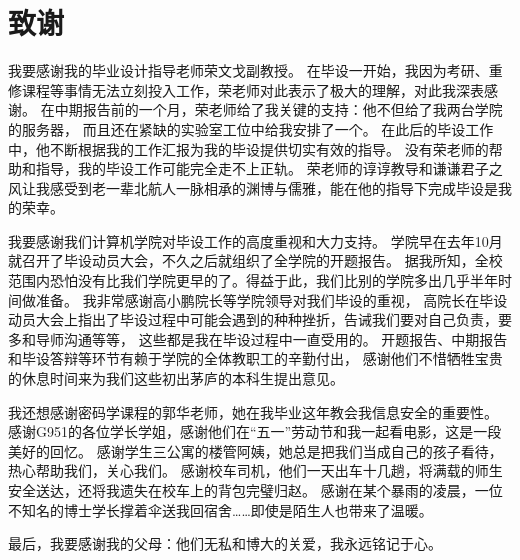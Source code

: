% 
% 
% 
% 

\chapter*{致谢}
我要感谢我的毕业设计指导老师荣文戈副教授。
在毕设一开始，我因为考研、重修课程等事情无法立刻投入工作，荣老师对此表示了极大的理解，对此我深表感谢。
在中期报告前的一个月，荣老师给了我关键的支持：他不但给了我两台学院的服务器，
而且还在紧缺的实验室工位中给我安排了一个。
在此后的毕设工作中，他不断根据我的工作汇报为我的毕设提供切实有效的指导。
没有荣老师的帮助和指导，我的毕设工作可能完全走不上正轨。
荣老师的谆谆教导和谦谦君子之风让我感受到老一辈北航人一脉相承的渊博与儒雅，能在他的指导下完成毕设是我的荣幸。

我要感谢我们计算机学院对毕设工作的高度重视和大力支持。
学院早在去年10月就召开了毕设动员大会，不久之后就组织了全学院的开题报告。
据我所知，全校范围内恐怕没有比我们学院更早的了。得益于此，我们比别的学院多出几乎半年时间做准备。
我非常感谢高小鹏院长等学院领导对我们毕设的重视，
高院长在毕设动员大会上指出了毕设过程中可能会遇到的种种挫折，告诫我们要对自己负责，要多和导师沟通等等，
这些都是我在毕设过程中一直受用的。
开题报告、中期报告和毕设答辩等环节有赖于学院的全体教职工的辛勤付出，
感谢他们不惜牺牲宝贵的休息时间来为我们这些初出茅庐的本科生提出意见。

我还想感谢密码学课程的郭华老师，她在我毕业这年教会我信息安全的重要性。
感谢G951的各位学长学姐，感谢他们在“五一”劳动节和我一起看电影，这是一段美好的回忆。
感谢学生三公寓的楼管阿姨，她总是把我们当成自己的孩子看待，热心帮助我们，关心我们。
感谢校车司机，他们一天出车十几趟，将满载的师生安全送达，还将我遗失在校车上的背包完璧归赵。
感谢在某个暴雨的凌晨，一位不知名的博士学长撑着伞送我回宿舍……即使是陌生人也带来了温暖。

最后，我要感谢我的父母：他们无私和博大的关爱，我永远铭记于心。
